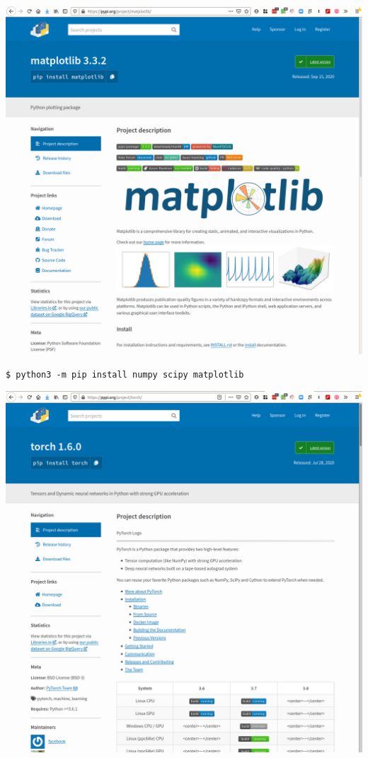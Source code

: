 \begin{frame}
  \includegraphics[width=\columnwidth]{figs/pypi-matplotlib.png}
\end{frame}

\begin{frame}[fragile]
  \begin{example}[Installation]
    \begin{lstlisting}[language={},numbers=none]
$ python3 -m pip install numpy scipy matplotlib
    \end{lstlisting}
  \end{example}
\end{frame}

\begin{frame}
  \includegraphics[width=\columnwidth]{figs/pypi-torch.png}
\end{frame}

